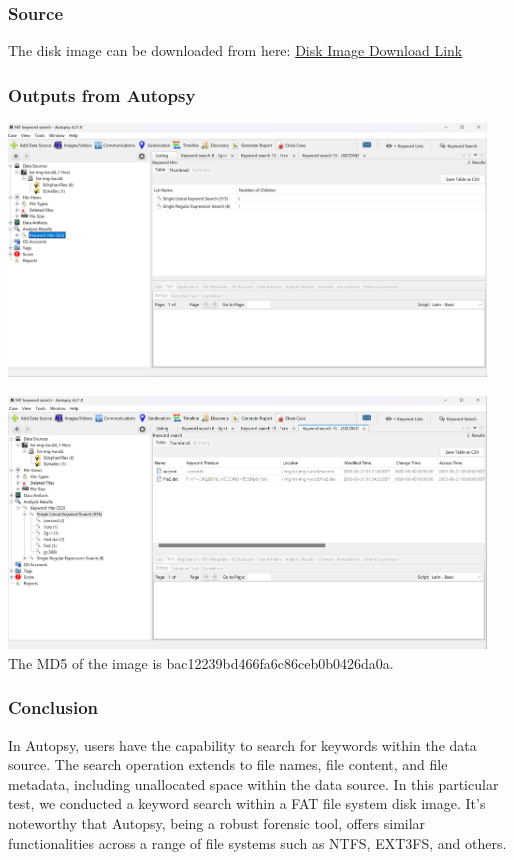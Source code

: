 \documentclass{article}
\begin{document}
\subsubsection*{Source}
The disk image can be downloaded from here: \href{http://prdownloads.sourceforge.net/dftt/2-kwsrch-fat.zip?download}{Disk Image Download Link}

\subsubsection*{Outputs from Autopsy}
\begin{center}
    \includegraphics[width=0.95\textwidth]{6/6.2/Search Results for keyword.png}
\end{center}

\begin{center}
    \includegraphics[width=0.95\textwidth]{6/6.2/Search Results for keyword _second_.png} \\
    The MD5 of the image is bac12239bd466fa6c86ceb0b0426da0a.
\end{center}

\subsubsection*{Conclusion}
In Autopsy, users have the capability to search for keywords within the data source. The search operation extends to file names, file content, and file metadata, including unallocated space within the data source. In this particular test, we conducted a keyword search within a FAT file system disk image. It's noteworthy that Autopsy, being a robust forensic tool, offers similar functionalities across a range of file systems such as NTFS, EXT3FS, and others.
\end{document}
